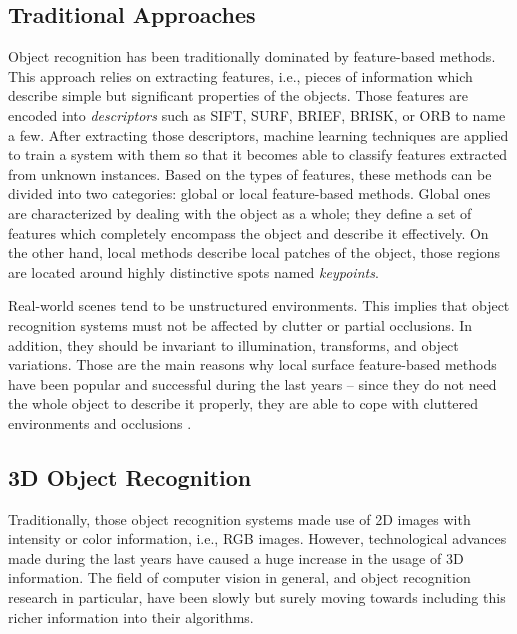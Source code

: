 \subsection{Traditional Approaches}
\label{cha:objrecog:sec:relatedworks:subsec:traditional}

Object recognition has been traditionally dominated by feature-based methods. This approach relies on extracting features, i.e., pieces of information which describe simple but significant properties of the objects. Those features are encoded into \emph{descriptors} such as \ac{SIFT}\cite{Lowe2004}, \ac{SURF}\cite{Bay2006}, \ac{BRIEF}\cite{Calonder2010}, \ac{BRISK}\cite{Leutenegger2011}, or \ac{ORB}\cite{Rublee2011} to name a few. After extracting those descriptors, machine learning techniques are applied to train a system with them so that it becomes able to classify features extracted from unknown instances. Based on the types of features, these methods can be divided into two categories: global or local feature-based methods. Global ones are characterized by dealing with the object as a whole; they define a set of features which completely encompass the object and describe it effectively. On the other hand, local methods describe local patches of the object, those regions are located around highly distinctive spots named \emph{keypoints}. 

Real-world scenes tend to be unstructured environments. This implies that object recognition systems must not be affected by clutter or partial occlusions. In addition, they should be invariant to illumination, transforms, and object variations. Those are the main reasons why local surface feature-based methods have been popular and successful during the last years -- since they do not need the whole object to describe it properly, they are able to cope with cluttered environments and occlusions \cite{Lowe1999}. 

\subsection{3D Object Recognition}
\label{cha:objrecog:sec:relatedworks:subsec:3d}

Traditionally, those object recognition systems made use of \acs{2D} images with intensity or color information, i.e., \ac{RGB} images. However, technological advances made during the last years have caused a huge increase in the usage of \acs{3D} information. The field of computer vision in general, and object recognition research in particular, have been slowly but surely moving towards including this richer information into their algorithms.

